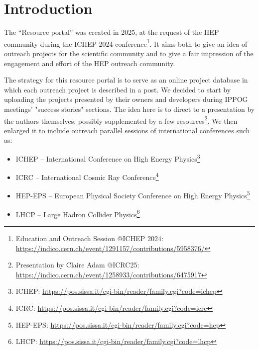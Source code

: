 \chapter*{Introduction}\label{part:intro}

The “Resource portal” was created in 2025, at the request of the HEP community during the ICHEP 2024 conference\footnote{
Education and Outreach Session @ICHEP 2024: \href{https://indico.cern.ch/event/1291157/contributions/5958376/}{https://indico.cern.ch/event/1291157/contributions/5958376/}}. It aims both to give an idea of outreach projects for the scientific community and to give a fair impression of the engagement and effort of the HEP outreach community.

The strategy for this resource portal is to serve as an online project database in which each outreach project is described in a post. We decided to start by uploading the projects presented by their owners and developers during IPPOG meetings' "success stories" sections. The idea here is to direct to a presentation by the authors themselves, possibly supplemented by a few resources\footnote{Presentation by Claire Adam @ICRC25: \href{https://indico.cern.ch/event/1258933/contributions/6475917/attachments/3105903/5509177/IPPOG-ICRC-ClaireAdam.pdf}{https://indico.cern.ch/event/1258933/contributions/6475917}}. We then enlarged it to include outreach parallel sessions of international conferences such as:
\begin{itemize}
    \item ICHEP – International Conference on High Energy Physics\footnote{ICHEP: \href{https://pos.sissa.it/cgi-bin/reader/family.cgi?code=ichep}{https://pos.sissa.it/cgi-bin/reader/family.cgi?code=ichep}}
    \item ICRC – International Cosmic Ray Conference\footnote{ICRC: \href{https://pos.sissa.it/cgi-bin/reader/family.cgi?code=icrc}{https://pos.sissa.it/cgi-bin/reader/family.cgi?code=icrc}}
    \item HEP-EPS – European Physical Society Conference on High Energy Physics\footnote{HEP-EPS: \href{https://pos.sissa.it/cgi-bin/reader/family.cgi?code=hep}{https://pos.sissa.it/cgi-bin/reader/family.cgi?code=hep}}
    \item LHCP – Large Hadron Collider Physics\footnote{LHCP: \href{https://pos.sissa.it/cgi-bin/reader/family.cgi?code=lhcp}{https://pos.sissa.it/cgi-bin/reader/family.cgi?code=lhcp}}
\end{itemize}

